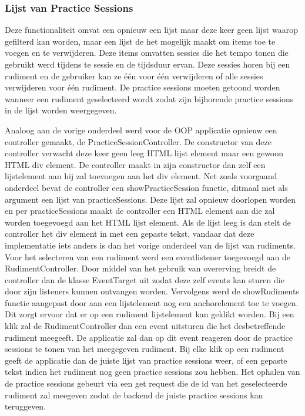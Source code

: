  \subsubsection{Lijst van Practice Sessions}
 Deze functionaliteit omvat een opnieuw een lijst maar deze keer geen lijst waarop gefilterd kan worden, maar een lijst de het mogelijk maakt om items toe te voegen en te verwijderen. Deze items omvatten sessies die het tempo tonen die gebruikt werd tijdens te sessie en de tijdsduur ervan. Deze sessies horen bij een rudiment en de gebruiker kan ze één voor één verwijderen of alle sessies verwijderen voor één rudiment. De practice sessions moeten getoond worden wanneer een rudiment geselecteerd wordt zodat zijn bijhorende practice sessions in de lijst worden weergegeven.

Analoog aan de vorige onderdeel werd voor de OOP applicatie opnieuw een controller gemaakt, de PracticeSessionController. De constructor van deze controller verwacht deze keer geen leeg HTML lijst element maar een gewoon HTML div element. De controller maakt in zijn constructor dan zelf een lijstelement aan hij zal toevoegen aan het div element. Net zoals voorgaand onderdeel bevat de controller een showPracticeSession functie, ditmaal met als argument een lijst van practiceSessions. Deze lijst zal opnieuw doorlopen worden en per practiceSessions maakt de controller een HTML element aan die zal worden toegevoegd aan het HTML lijst element. Als de lijst leeg is dan stelt de controller het div element in met een gepaste tekst, vandaar dat deze implementatie iets anders is dan het vorige onderdeel van de lijst van rudiments. Voor het selecteren van een rudiment werd een eventlistener toegevoegd aan de RudimentController. Door middel van het gebruik van overerving breidt de controller dan de klasse EventTarget uit zodat deze zelf events kan sturen die door zijn listeners kunnen ontvangen worden. Vervolgens werd de showRudiments functie aangepast door aan een lijstelement nog een anchorelement toe te voegen. Dit zorgt ervoor dat er op een rudiment lijstelement kan geklikt worden. Bij een klik zal de RudimentController dan een event uitsturen die het desbetreffende rudiment meegeeft. De applicatie zal dan op dit event reageren door de practice sessions te tonen van het meegegeven rudiment. Bij elke klik op een rudiment geeft de applicatie dan de juiste lijst van practice sessions weer, of een gepaste tekst indien het rudiment nog geen practice sessions zou hebben. Het ophalen van de practice sessions gebeurt via een get request die de id van het geselecteerde rudiment zal meegeven zodat de backend de juiste practice sessions kan teruggeven.  

